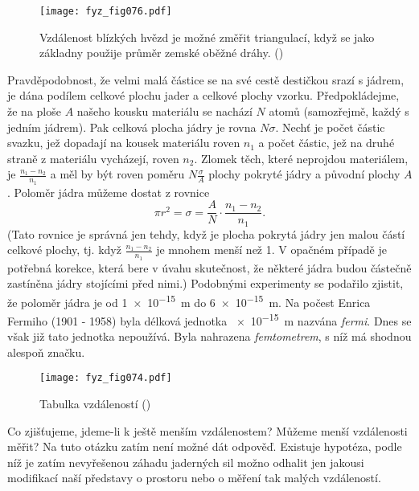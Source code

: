     \begin{figure}[ht!]  %
      \centering
      \texttt{[image: fyz\_fig076.pdf]}
      \caption{Vzdálenost blízkých hvězd je možné změřit triangulací, když se jako základny použije 
               průměr zemské oběžné dráhy. (\cite[s.~71]{Feynman01})}
      \label{fyz:fig076}
    \end{figure}   
    Pravděpodobnost, že velmi malá částice se na své cestě destičkou srazí s jádrem, je dána 
    podílem celkové plochu jader a celkové plochy vzorku. Předpokládejme, že na ploše \(A\) našeho 
    kousku materiálu se nachází \(N\) atomů (samozřejmě, každý s jedním jádrem). Pak celková plocha 
     jádry je rovna \(N\sigma\). Nechť je počet částic svazku, jež dopadají na kousek 
    materiálu roven \(n_1\) a počet částic, jež na druhé straně z materiálu vycházejí, roven 
    \(n_2\). Zlomek těch, které neprojdou materiálem, je \(\frac{n_1-n_2}{n_1}\) a měl by být roven 
    poměru \(N\frac{\sigma}{A}\) plochy pokryté jádry a původní plochy \(A\). Poloměr jádra můžeme 
    dostat z rovnice
    \begin{equation}\label{FYZ:eq066}
      \pi r^2 = \sigma = \frac{A}{N}\cdot\frac{n_1-n_2}{n_1}.
    \end{equation}
    (Tato rovnice je správná jen tehdy, když je plocha pokrytá jádry jen malou částí celkové 
    plochy, tj. když \(\frac{n_1-n_2}{n_1}\) je mnohem menší než \num{1}. V opačném případě je 
    potřebná korekce, která bere v úvahu skutečnost, že některé jádra budou částečně zastíněna 
    jádry stojícími před nimi.) Podobnými experimenty se podařilo zjistit, že poloměr jádra je od 
    \SI{1e-15}{\m} do \SI{6e-15}{\m}. Na počest Enrica Fermiho (1901 - 1958) byla délková jednotka 
    \SI{e-15}{\m} nazvána \emph{fermi}. Dnes se však již tato jednotka nepoužívá. Byla nahrazena 
    \emph{femtometrem}, s níž má shodnou alespoň značku.
    
    \begin{figure}[ht!]  %
      \centering
      \texttt{[image: fyz\_fig074.pdf]}
      \caption{Tabulka vzdáleností (\cite[s.~75]{Feynman01})}
      \label{fyz:fig074}
    \end{figure}
    
    Co zjišťujeme, jdeme-li k ještě menším vzdálenostem? Můžeme menší vzdálenosti měřit? Na tuto 
    otázku zatím není možné dát odpověď. Existuje hypotéza, podle níž je zatím nevyřešenou záhadu 
    jaderných sil možno odhalit jen jakousi modifikací naší představy o prostoru nebo o měření tak 
    malých vzdáleností.
    
